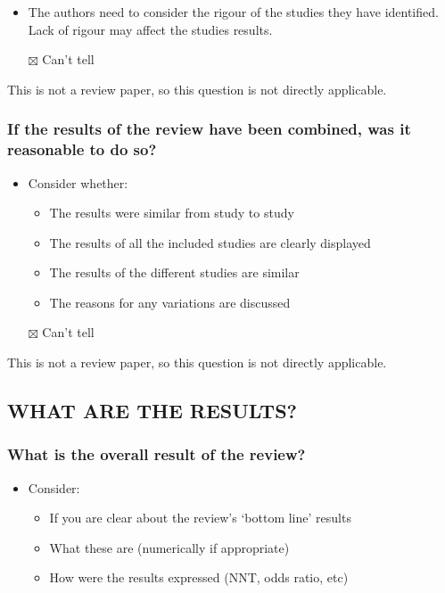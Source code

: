 \documentclass[
  doc, a4paper]{apa7}
\providecommand{\tightlist}{%
  \setlength{\itemsep}{0pt}\setlength{\parskip}{0pt}}
\begin{document}
\begin{itemize}
\tightlist
\item
  The authors need to consider the rigour of the studies they have identified. Lack of rigour may affect the studies results.
\item[$\boxtimes$]
  Can't tell
\end{itemize}

This is not a review paper, so this question is not directly applicable.

\subsubsection{If the results of the review have been combined, was it reasonable to do so?}\label{if-the-results-of-the-review-have-been-combined-was-it-reasonable-to-do-so}

\begin{itemize}
\tightlist
\item
  Consider whether:

  \begin{itemize}
  \tightlist
  \item
    The results were similar from study to study
  \item
    The results of all the included studies are clearly displayed
  \item
    The results of the different studies are similar
  \item
    The reasons for any variations are discussed
  \end{itemize}
\item[$\boxtimes$]
  Can't tell
\end{itemize}

This is not a review paper, so this question is not directly applicable.

\subsection{WHAT ARE THE RESULTS?}\label{what-are-the-results}

\subsubsection{What is the overall result of the review?}\label{what-is-the-overall-result-of-the-review}

\begin{itemize}
\tightlist
\item
  Consider:

  \begin{itemize}
  \tightlist
  \item
    If you are clear about the review's `bottom line' results
  \item
    What these are (numerically if appropriate)
  \item
    How were the results expressed (NNT, odds ratio, etc)
  \end{itemize}
\end{itemize}
\end{document}
